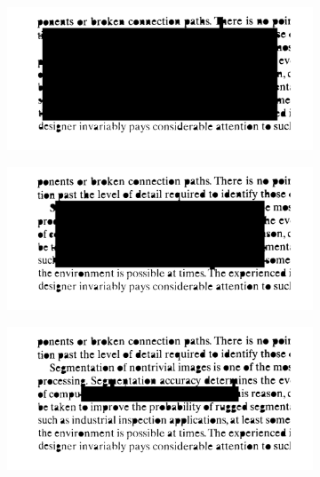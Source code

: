 \begin{figure}[h!]
	\centering
	\begin{subfigure}[b]{0.45\linewidth}
		\includegraphics[width=\linewidth]{myfigure/p8/fig0931(d100).png}
		\caption{}
		\label{fig:0931d100}
	\end{subfigure}
	\begin{subfigure}[b]{0.45\linewidth}
    	\includegraphics[width=\linewidth]{myfigure/p8/fig0931(d200).png}
    	\caption{}
    	\label{fig:0931d200}
  	\end{subfigure}
  	\begin{subfigure}[b]{0.45\linewidth}
		\includegraphics[width=\linewidth]{myfigure/p8/fig0931(d400).png}
		\caption{}
		\label{fig:0931d400}
	\end{subfigure}

\end{figure}
